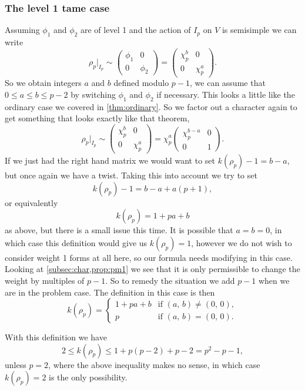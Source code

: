 \documentclass[a4paper,12pt]{article}
\begin{document}
\subsubsection{The level 1 tame case}\label{sec:l1t}
Assuming $\phi_1$ and $\phi_2$ are of level 1 and the action of $I_p$ on $V$ is semisimple we can write
\[
\rho_p |_{I_p} \sim \begin{pmatrix}
\phi_1 & 0 \\
0      & \phi_2 \end{pmatrix} = \begin{pmatrix}
\chi_p^b & 0 \\
0      & \chi_p^a \end{pmatrix}.
\]
So we obtain integers $a$ and $b$ defined modulo $p-1$, we can assume that $0\le a \le b \le p-2$ by switching $\phi_1$ and $\phi_2$ if necessary.
This looks a little like the ordinary case we covered in \cref{thm:ordinary}.
So we factor out a character again to get something that looks exactly like that theorem,
\[
\rho_p|_{I_p} \sim
\begin{pmatrix}
\chi_p^b & 0 \\
0        & \chi_p^a \end{pmatrix}=
\chi_p^a\begin{pmatrix}
\chi_p^{b-a} & 0 \\
0            & 1 \end{pmatrix}.
\]
If we just had the right hand matrix we would want to set $k(\rho_p) - 1 = b-a$, but once again we have a twist.
Taking this into account we try to set
\[
k(\rho_p) - 1 = b - a + a(p+1),
\]
or equivalently
\[
k(\rho_p) = 1 + pa + b
\]
as above, but there is a small issue this time.
It is possible that $a = b = 0$, in which case this definition would give us $k(\rho_p) = 1$, however we do not wish to consider weight 1 forms at all here, so our formula needs modifying in this case.
Looking at \cref{subsec:char,prop:pm1} we see that it is only permissible to change the weight by multiples of $p-1$.
So to remedy the situation we add $p-1$ when we are in the problem case.
The definition in this case is then
\begin{equation}\label{eq:l1t}
k(\rho_p) = \begin{cases}
1 + pa + b & \text{if }(a,\,b) \ne (0,\,0), \\
         p & \text{if }(a,\,b) = (0,\,0).
\end{cases}
\end{equation}

With this definition we have
\[
2\le k(\rho_p) \le 1 + p(p-2) + p-2 = p^2 - p - 1,
\]
unless $p = 2$, where the above inequality makes no sense, in which case $k(\rho_p) = 2$ is the only possibility.
\end{document}
